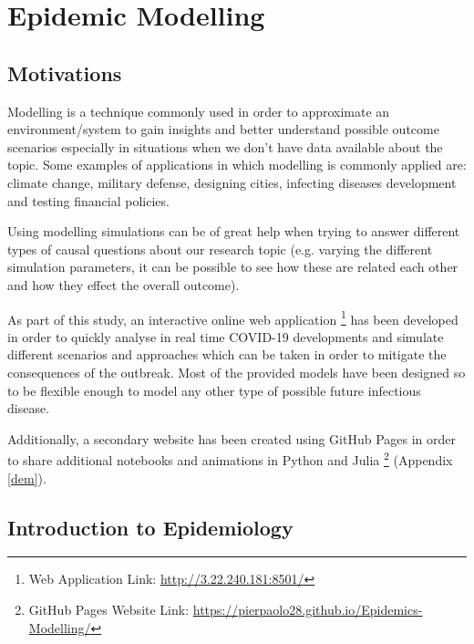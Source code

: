 \chapter{Epidemic Modelling}
\label{ch:progress}

\section{Motivations}
Modelling is a technique commonly used in order to approximate an environment/system to gain insights and better understand possible outcome scenarios especially in situations when we don't have data available about the topic. Some examples of applications in which modelling is commonly applied are: climate change, military defense, designing cities, infecting diseases development and testing financial policies. 

Using modelling simulations can be of great help when trying to answer different types of causal questions about our research topic (e.g. varying the different simulation parameters, it can be possible to see how these are related each other and how they effect the overall outcome). 

As part of this study, an interactive online web application \footnote{Web Application Link: \url{http://3.22.240.181:8501/}} has been developed in order to quickly analyse in real time COVID-19 developments and simulate different scenarios and approaches which can be taken in order to mitigate the consequences of the outbreak. Most of the provided models have been designed so to be flexible enough to model any other type of possible future infectious disease. 

Additionally, a secondary website has been created using GitHub Pages in order to share additional notebooks and animations in Python and Julia \footnote{GitHub Pages Website Link: \url{https://pierpaolo28.github.io/Epidemics-Modelling/}} (Appendix \ref{dem}). 

\section{Introduction to Epidemiology}

